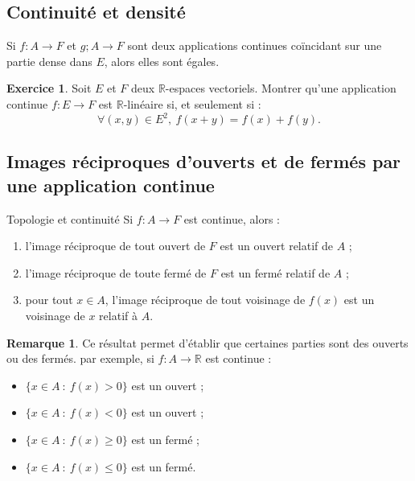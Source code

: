 \documentclass[french]{article}
\newcommand{\R}{\mathbb{R}}
\theoremstyle{plain}
\theoremstyle{definition}
\newtheorem{exo}{Exercice}
\newtheorem*{rmq}{Remarque}
\theoremstyle{remark}
\begin{document}
\subsection{Continuité et densité}

\begin{thm}{}%
	Si $f:A\to F$ et $g;A\to F$ sont deux applications continues coïncidant sur une partie dense dans $E$, alors elles sont égales.
\end{thm}

\begin{exo}
	Soit $E$ et $F$ deux $\R$-espaces vectoriels. Montrer qu'une application continue $f:E\to F$ est $\R$-linéaire si, et seulement si : $$\forall (x,y)\in E^2,\ f(x+y)=f(x)+f(y).$$
\end{exo}

\subsection{Images réciproques d'ouverts et de fermés par une application continue}

\begin{thm}{Topologie et continuité}
	Si $f:A\to F$ est continue, alors :
	\begin{enumerate}[label=(\roman*)]
		\item l'image réciproque de tout ouvert de $F$ est un ouvert relatif de $A$ ;
		\item l'image réciproque de toute fermé de $F$ est un fermé relatif de $A$ ;
		\item pour tout $x\in A$, l'image réciproque de tout voisinage de $f(x)$ est un voisinage de $x$ relatif à $A$.
	\end{enumerate}
\end{thm}

\begin{rmq}
	Ce résultat permet d'établir que certaines parties sont des ouverts ou des fermés. par exemple, si $f:A\to\R$ est continue :
	\begin{itemize}
		\item $\{x\in A\ : \ f(x)>0\}$ est un ouvert ;
		\item $\{x\in A\ : \ f(x)<0\}$ est un ouvert ;
		\item $\{x\in A\ : \ f(x)\geqslant0\}$ est un fermé ;
		\item $\{x\in A\ : \ f(x)\leqslant0\}$ est un fermé.
	\end{itemize}
\end{rmq}
\end{document}
